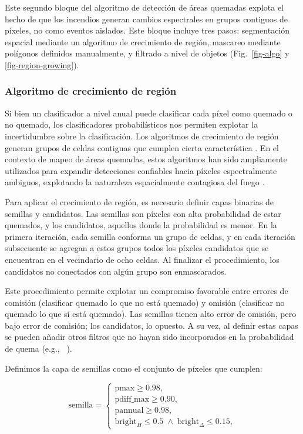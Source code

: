 \documentclass[11pt,a4paper]{article}
\begin{document}
Este segundo bloque del algoritmo de detección de áreas quemadas explota el hecho de que los incendios generan cambios espectrales en grupos contiguos de píxeles, no como eventos aislados. Este bloque incluye tres pasos: segmentación espacial mediante un algoritmo de crecimiento de región, mascareo mediante polígonos definidos manualmente, y filtrado a nivel de objetos (Fig.~\ref{fig-algo} y \ref{fig-region-growing}). 

\subsubsection{Algoritmo de crecimiento de región}

Si bien un clasificador a nivel anual puede clasificar cada píxel como quemado o no quemado, los clasificadores probabilísticos nos permiten explotar la incertidumbre sobre la clasificación. Los algoritmos de crecimiento de región generan grupos de celdas contiguas que cumplen cierta característica \parencite{adams_bischof_1994,haralick_shapiro_1985}. En el contexto de mapeo de áreas quemadas, estos algoritmos han sido ampliamente utilizados para expandir detecciones confiables hacia píxeles espectralmente ambiguos, explotando la naturaleza espacialmente contagiosa del fuego \parencite{fraser2000,giglio2009,hawbaker2020,long2019}.

Para aplicar el crecimiento de región, es necesario definir capas binarias de semillas y candidatos. Las semillas son píxeles con alta probabilidad de estar quemados, y los candidatos, aquellos donde la probabilidad es menor. En la primera iteración, cada semilla conforma un grupo de celdas, y en cada iteración subsecuente se agregan a estos grupos todos los píxeles candidatos que se encuentran en el vecindario de ocho celdas. Al finalizar el procedimiento, los candidatos no conectados con algún grupo son enmascarados.

Este procedimiento permite explotar un compromiso favorable entre errores de comisión (clasificar quemado lo que no está quemado) y omisión (clasificar no quemado lo que sí está quemado). Las semillas tienen alto error de omisión, pero bajo error de comisión; los candidatos, lo opuesto. A su vez, al definir estas capas se pueden añadir otros filtros que no hayan sido incorporados en la probabilidad de quema (e.g., \citeauthor{long2019}~\citeyear{long2019}).

Definimos la capa de semillas como el conjunto de píxeles que cumplen:

\[
\text{semilla} =
\left\{
\begin{array}{l}
\text{pmax} \ge 0.98, \\
\text{pdiff\_max} \ge 0.90, \\
\text{pannual} \ge 0.98, \\
\mathrm{bright}_H \le 0.5 \;\land\;
\mathrm{bright}_{\Delta} \le 0.15,
\end{array}
\right.
\]
\end{document}
